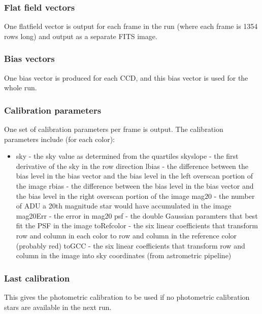 \subsubsection{Flat field vectors}

One flatfield vector is output for each frame in the run (where each frame
is 1354 rows long) and output as a separate FITS image.

\subsubsection{Bias vectors}

One bias vector is produced for each CCD, and this bias vector is
used for the whole run.

\subsubsection{Calibration parameters}

One set of calibration parameters per frame is output.  The calibration
parameters include (for each color):

\begin {itemize}
\item sky - the sky value as determined from the quartiles
\sitem skyslope - the first derivative of the sky in the row direction
\sitem lbias - the difference between the bias level in the bias vector and the
  bias level in the left overscan portion of the image
\sitem rbias - the difference between the bias level in the bias vector and the
  bias level in the right overscan portion of the image
\sitem mag20 - the number of ADU a 20th magnitude star would have accumulated
  in the image
\sitem mag20Err - the error in mag20
\sitem psf - the double Gaussian paramters that best fit the PSF in the image
\sitem toRefcolor - the six linear coefficients that transform row and column
  in each color to row and column in the reference color (probably red)
\sitem toGCC - the six linear coefficients that transform row and column
  in the image into sky coordinates (from astrometric pipeline)
\end {itemize}

\subsubsection{Last calibration}

This gives
the photometric calibration to be used if no photometric calibration
stars are available in the next run.  

